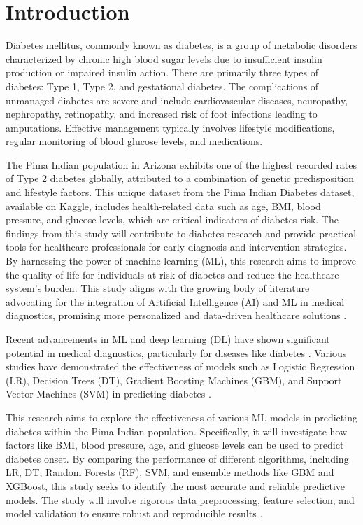 \section{Introduction}
Diabetes mellitus, commonly known as diabetes, is a group of metabolic disorders characterized by chronic high blood sugar levels due to insufficient insulin production or impaired insulin action. There are primarily three types of diabetes: Type 1, Type 2, and gestational diabetes. The complications of unmanaged diabetes are severe and include cardiovascular diseases, neuropathy, nephropathy, retinopathy, and increased risk of foot infections leading to amputations. Effective management typically involves lifestyle modifications, regular monitoring of blood glucose levels, and medications.

The Pima Indian population in Arizona exhibits one of the highest recorded rates of Type 2 diabetes globally, attributed to a combination of genetic predisposition and lifestyle factors. This unique dataset from the Pima Indian Diabetes dataset, available on Kaggle, includes health-related data such as age, BMI, blood pressure, and glucose levels, which are critical indicators of diabetes risk. The findings from this study will contribute to diabetes research and provide practical tools for healthcare professionals for early diagnosis and intervention strategies. By harnessing the power of machine learning (ML), this research aims to improve the quality of life for individuals at risk of diabetes and reduce the healthcare system's burden. This study aligns with the growing body of literature advocating for the integration of Artificial Intelligence (AI) and ML in medical diagnostics, promising more personalized and data-driven healthcare solutions \cite{Ref1}.

Recent advancements in ML and deep learning (DL) have shown significant potential in medical diagnostics, particularly for diseases like diabetes \cite{Ref2}. Various studies have demonstrated the effectiveness of models such as Logistic Regression (LR), Decision Trees (DT), Gradient Boosting Machines (GBM), and Support Vector Machines (SVM) in predicting diabetes \cite{Ref3}.

This research aims to explore the effectiveness of various ML models in predicting diabetes within the Pima Indian population. Specifically, it will investigate how factors like BMI, blood pressure, age, and glucose levels can be used to predict diabetes onset. By comparing the performance of different algorithms, including LR, DT, Random Forests (RF), SVM, and ensemble methods like GBM and XGBoost, this study seeks to identify the most accurate and reliable predictive models. The study will involve rigorous data preprocessing, feature selection, and model validation to ensure robust and reproducible results \cite{Ref4}.

